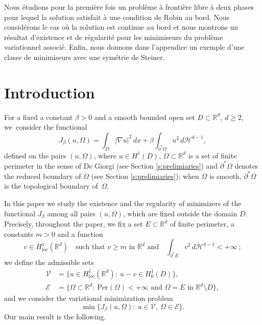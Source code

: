 \documentclass[JEP,XML,SOM,Unicode]{cedram}
\newcommand{\loc}{\mathrm{loc}}
\newcommand{\Per}{\mathrm{Per}}
\theoremstyle{plain}
\theoremstyle{definition}
\def\R{\mathbb{R}}
\def\HH{\mathcal{H}}
\begin{document}

\begin{altabstract}
Nous étudions pour la première fois un problème à frontière libre à deux phases pour lequel la solution satisfait à une condition de Robin au bord. Nous considérons le cas où la solution est continue au bord et nous montrons un résultat d'existence et de régularité pour les minimiseurs du problème variationnel associé. Enfin, nous donnons dans l'appendice un exemple d'une classe de minimiseurs avec une symétrie de Steiner.
\end{altabstract}

\maketitle
\tableofcontents
\mainmatter

\section{Introduction}\label{s:intro}
For a fixed a constant $\beta>0$ and a smooth bounded open set $D\subset \R^d$, $d\ge 2$, we~consider the functional
\[J_\beta(u,\Omega)=\int_D|\nabla u|^2\,dx+\beta\int_{\partial^\ast \Omega}u^2\,d\HH^{d-1},\]
defined on the pairs $(u,\Omega)$, where $u\in H^1(D)$, $\Omega\subset\R^d$ is a set of finite perimeter in the sense of De Giorgi (see Section \ref{s:prelimiaries})
and $\partial^\ast\Omega$ denotes the reduced boundary of $\Omega$ (see Section \ref{s:prelimiaries}); when $\Omega$ is smooth, $\partial^\ast\Omega$ is the topological boundary of~$\Omega$.

In this paper we study the existence and the regularity of minimizers of the functional $J_\beta$
among all pairs $(u,\Omega)$, which are fixed outside the domain $D$. Precisely, throughout the paper, we fix a set $E\subset\R^d$ of finite perimeter, a constants $m>0$ and a function
\[v\in H^1_{\loc}(\R^d)\quad\text{such that $v\ge m$ in $\R^d$ and}\quad\int_{\partial^\ast E}v^2\,d\HH^{d-1}<+\infty\ ;\]
we define the admissible sets
\begin{align*}
\mathcal V&=\big\{u\in H^1_{\loc}(\R^d):\ u-v\in H^1_0(D)\big\},\\
\mathcal E&=\big\{\Omega\subset\R^d:\ \Per(\Omega)<+\infty\text{ and } \Omega=E \text{ in } \R^d\setminus D\big\},
\end{align*}
and we consider the variational minimization problem
\begin{equation}\label{e:pb}
\min\big\{J_\beta(u,\Omega):\ u\in\mathcal V,\ \Omega\in\mathcal E\big\}.
\end{equation}
Our main result is the following.
\end{document}
